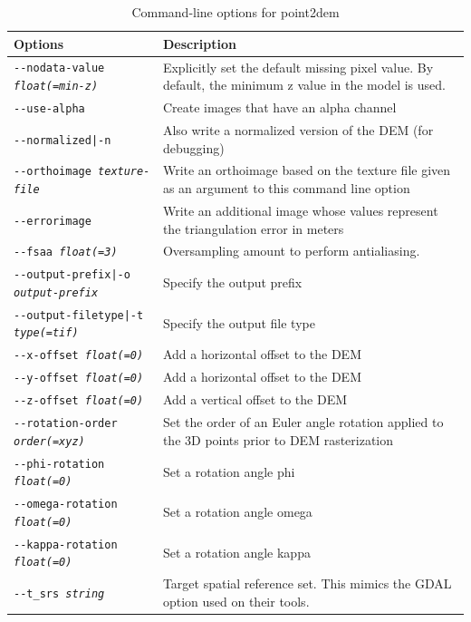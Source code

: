 \begin{longtable}{|l|p{10cm}|}
\caption{Command-line options for point2dem}
\label{tbl:point2dem}
\endfirsthead
\endhead
\endfoot
\endlastfoot
\hline
Options & Description \\ \hline \hline
\texttt{-\/-nodata-value \textit{float(=min-z)}} & Explicitly set the default missing pixel value. By default, the minimum z value in the model is used. \\ \hline
\texttt{-\/-use-alpha} & Create images that have an alpha channel \\ \hline
\texttt{-\/-normalized|-n} & Also write a normalized version of the \ac{DEM} (for debugging) \\ \hline
\texttt{-\/-orthoimage \textit{texture-file}} & Write an orthoimage based on the texture file given as an argument to this command line option \\ \hline
\texttt{-\/-errorimage} & Write an additional image whose values represent the triangulation error in meters \\ \hline
\texttt{-\/-fsaa  \textit{float(=3)}} & Oversampling amount to perform antialiasing. \\ \hline
\texttt{-\/-output-prefix|-o \textit{output-prefix}} & Specify the output prefix \\ \hline
\texttt{-\/-output-filetype|-t \textit{type(=tif)}} & Specify the output file type \\ \hline
\hline
\texttt{-\/-x-offset \textit{float(=0)}} & Add a horizontal offset to the \ac{DEM} \\ \hline
\texttt{-\/-y-offset \textit{float(=0)}} & Add a horizontal offset to the \ac{DEM} \\ \hline
\texttt{-\/-z-offset \textit{float(=0)}} & Add a vertical offset to the \ac{DEM} \\ \hline
\texttt{-\/-rotation-order \textit{order(=xyz)}} & Set the order of an Euler angle rotation applied to the 3D points prior to \ac{DEM} rasterization \\ \hline
\texttt{-\/-phi-rotation \textit{float(=0)}} & Set a rotation angle phi \\ \hline
\texttt{-\/-omega-rotation \textit{float(=0)}} & Set a rotation angle omega \\ \hline
\texttt{-\/-kappa-rotation \textit{float(=0)}} & Set a rotation angle kappa \\ \hline
\hline
\texttt{-\/-t\_srs \textit{string}} & Target spatial reference set. This mimics the GDAL option used on their tools. \\ \hline

\end{longtable}

